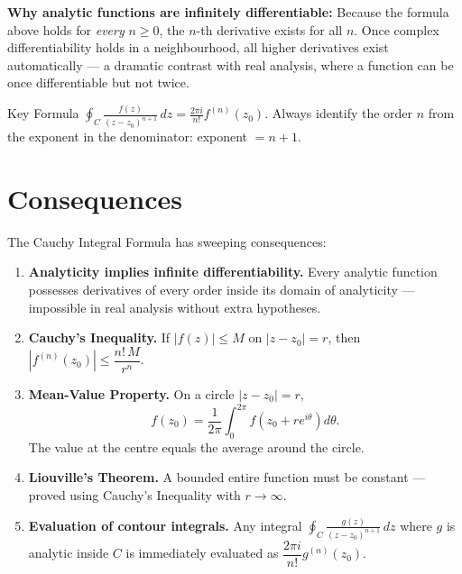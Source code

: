 \documentclass[12pt,a4paper]{article}
\begin{document}
\medskip

\noindent\textbf{Why analytic functions are infinitely differentiable:}
Because the formula above holds for \emph{every} $n \geq 0$, the $n$-th derivative
exists for all $n$.  Once complex differentiability holds in a neighbourhood,
all higher derivatives exist automatically --- a dramatic contrast with real
analysis, where a function can be once differentiable but not twice.

\begin{learnbox}{Key Formula}
$\displaystyle\oint_{C}\frac{f(z)}{(z-z_0)^{n+1}}\,dz = \frac{2\pi i}{n!}f^{(n)}(z_0)$.
Always identify the order $n$ from the exponent in the denominator: exponent $= n+1$.
\end{learnbox}

\section{Consequences}

The Cauchy Integral Formula has sweeping consequences:

\begin{enumerate}[label=\textbf{\arabic*.}, leftmargin=*]
  \item \textbf{Analyticity implies infinite differentiability.}
        Every analytic function possesses derivatives of every order inside its
        domain of analyticity --- impossible in real analysis without extra hypotheses.

  \item \textbf{Cauchy's Inequality.}
        If $|f(z)| \leq M$ on $|z - z_0| = r$, then
        $|f^{(n)}(z_0)| \leq \dfrac{n!\,M}{r^n}$.

  \item \textbf{Mean-Value Property.}
        On a circle $|z - z_0| = r$,
        \[
          f(z_0) = \frac{1}{2\pi}\int_{0}^{2\pi} f\!\left(z_0 + re^{i\theta}\right)d\theta.
        \]
        The value at the centre equals the average around the circle.

  \item \textbf{Liouville's Theorem.}
        A bounded entire function must be constant --- proved using Cauchy's Inequality
        with $r \to \infty$.

  \item \textbf{Evaluation of contour integrals.}
        Any integral $\displaystyle\oint_C \frac{g(z)}{(z-z_0)^{n+1}}\,dz$ where
        $g$ is analytic inside $C$ is immediately evaluated as $\dfrac{2\pi i}{n!}g^{(n)}(z_0)$.
\end{enumerate}
\end{document}
